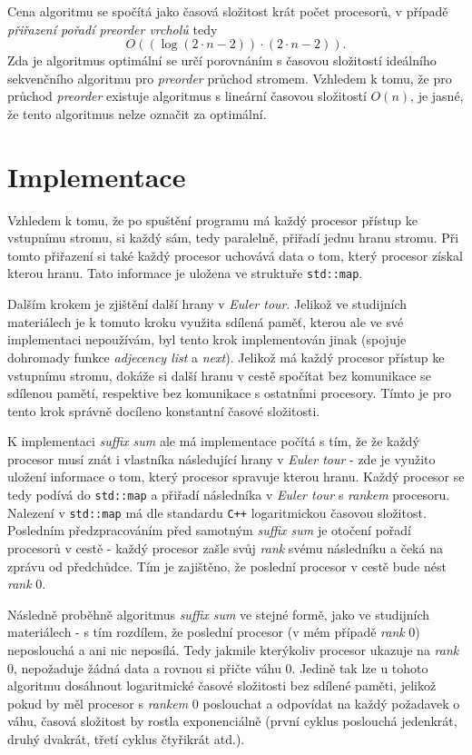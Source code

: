 \documentclass[12pt]{article}
\begin{document}
Cena algoritmu se spočítá jako časová složitost krát počet procesorů, v případě \textit{přiřazení pořadí preorder vrcholů} tedy
$$ O((\log (2 \cdot n - 2))\cdot (2 \cdot n - 2)). $$
Zda je algoritmus optimální se určí porovnáním s časovou složitostí ideálního sekvenčního algoritmu pro \textit{preorder} průchod stromem. Vzhledem k tomu, že pro průchod \textit{preorder} existuje algoritmus s lineární časovou složitostí $O(n)$, je jasné, že tento algoritmus nelze označit za optimální.

\newpage
\section{Implementace}

Vzhledem k tomu, že po spuštění programu má každý procesor přístup ke vstupnímu stromu, si každý sám, tedy paralelně, přiřadí jednu hranu stromu. Při tomto přiřazení si také každý procesor uchovává data o tom, který procesor získal kterou hranu. Tato informace je uložena ve struktuře \verb|std::map|.

Dalším krokem je zjištění další hrany v \textit{Euler tour}. Jelikož ve studijních materiálech je k tomuto kroku využita sdílená paměť, kterou ale ve své implementaci nepoužívám, byl tento krok implementován jinak (spojuje dohromady funkce \textit{adjecency list} a \textit{next}). Jelikož má každý procesor přístup ke vstupnímu stromu, dokáže si další hranu v cestě spočítat bez komunikace se sdílenou pamětí, respektive bez komunikace s ostatními procesory. Tímto je pro tento krok správně docíleno konstantní časové složitosti.

K implementaci \textit{suffix sum} ale má implementace počítá s tím, že že každý procesor musí znát i vlastníka následující hrany v \textit{Euler tour} - zde je využito uložení informace o tom, který procesor spravuje kterou hranu. Každý procesor se tedy podívá do \verb|std::map| a přiřadí následníka v \textit{Euler tour} s \textit{rankem} procesoru. Nalezení v \verb|std::map| má dle standardu \verb|C++| logaritmickou časovou složitost. Posledním předzpracováním před samotným \textit{suffix sum} je otočení pořadí procesorů v cestě - každý procesor zašle svůj \textit{rank} svému následníku a čeká na zprávu od předchůdce. Tím je zajištěno, že poslední procesor v cestě bude nést \textit{rank} 0.

Následně proběhně algoritmus \textit{suffix sum} ve stejné formě, jako ve studijních materiálech - s tím rozdílem, že poslední procesor (v mém případě \textit{rank} 0) neposlouchá a ani nic neposílá. Tedy jakmile kterýkoliv procesor ukazuje na \textit{rank} 0, nepožaduje žádná data a rovnou si přičte váhu 0. Jedině tak lze u tohoto algoritmu dosáhnout logaritmické časové složitosti bez sdílené paměti, jelikož pokud by měl procesor s \textit{rankem} 0 poslouchat a odpovídat na každý požadavek o váhu, časová složitost by rostla exponenciálně (první cyklus poslouchá jedenkrát, druhý dvakrát, třetí cyklus čtyřikrát atd.).
\end{document}
